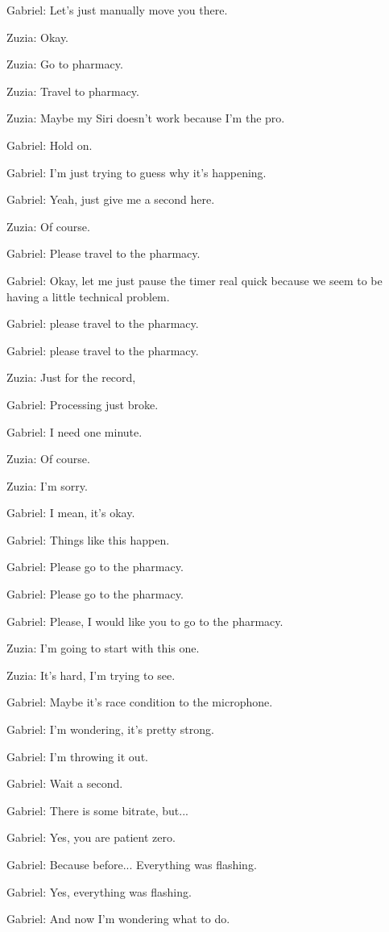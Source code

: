 Gabriel: Let's just manually move you there.

Zuzia: Okay.

Zuzia: Go to pharmacy.

Zuzia: Travel to pharmacy.

Zuzia: Maybe my Siri doesn't work because I'm the pro.

Gabriel: Hold on.

Gabriel: I'm just trying to guess why it's happening.

Gabriel: Yeah, just give me a second here.

Zuzia: Of course.

Gabriel: Please travel to the pharmacy.

Gabriel: Okay, let me just pause the timer real quick because we seem to be having a little technical problem.

Gabriel: please travel to the pharmacy.

Gabriel: please travel to the pharmacy.

Zuzia: Just for the record,

Gabriel: Processing just broke.

Gabriel: I need one minute.

Zuzia: Of course.

Zuzia: I'm sorry.

Gabriel: I mean, it's okay.

Gabriel: Things like this happen.

Gabriel: Please go to the pharmacy.

Gabriel: Please go to the pharmacy.

Gabriel: Please, I would like you to go to the pharmacy.

Zuzia: I'm going to start with this one.

Zuzia: It's hard, I'm trying to see.

Gabriel: Maybe it's race condition to the microphone.

Gabriel: I'm wondering, it's pretty strong.

Gabriel: I'm throwing it out.

Gabriel: Wait a second.

Gabriel: There is some bitrate, but...

Gabriel: Yes, you are patient zero.

Gabriel: Because before... Everything was flashing.

Gabriel: Yes, everything was flashing.

Gabriel: And now I'm wondering what to do.

